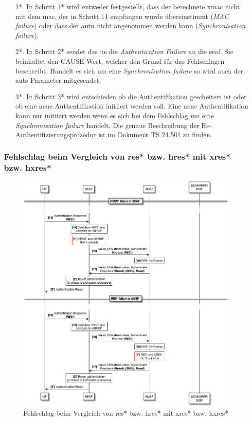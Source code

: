 \begin{enumerate}
\item[1*.] In Schritt 1* wird entweder festgestellt, dass der berechnete \gls{xmac} nicht mit dem \gls{mac}, der in Schritt 11 empfangen wurde übereinstimmt (\textit{MAC failure}) oder dass der \gls{autn} nicht angenommen werden kann (\textit{Synchronisation failure}).

\item[2*.] In Schritt 2* sendet das \gls{ue} die \textit{Authentication Failure} an die \gls{seaf}.
Sie beinhaltet den CAUSE Wert, welcher den Grund für das Fehlschlagen beschreibt.
Handelt es sich um eine \textit{Synchronisation failure} so wird auch der \gls{auts} Parameter mitgesendet.

\item[3*.] In Schritt 3* wird entschieden ob die Authentifikation gescheitert ist oder ob eine neue Authentifikation initiiert werden soll.
Eine neue Authentifikation kann nur initiiert werden wenn es sich bei dem Fehlschlag um eine \textit{Synchronisation failure} handelt.
Die genaue Beschreibung der Re-Authentifizierungsprozedur ist im Dokument TS 24.501 zu finden. %
\end{enumerate}


\subsubsection{Fehlschlag beim Vergleich von \gls{res*} bzw. \gls{hres*} mit \gls{xres*} bzw. \gls{hxres*}}

\begin{figure}[H]
  \centering
  \includegraphics[width=\textwidth]{uml/protocol_res*_verification_failure_v1.png}
  \caption{Fehlschlag beim Vergleich von \gls{res*} bzw. \gls{hres*} mit \gls{xres*} bzw. \gls{hxres*}}
  \label{fig:protocol_res*_verification_failure_v1}
\end{figure}

